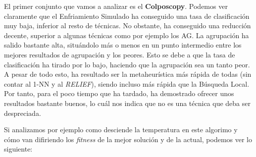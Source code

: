 \documentclass[11pt,a4paper]{article}
\begin{document}
El primer conjunto que vamos a analizar es el \textbf{Colposcopy}. Podemos ver claramente que el Enfriamiento Simulado ha conseguido
una tasa de clasificación muy baja, inferior al resto de técnicas. No obstante, ha conseguido una reducción decente, superior
a algunas técnicas como por ejemplo los AG. La agrupación ha salido bastante alta, situándolo más o menos en un punto intermedio
entre los mejores resultados de agrupación y los peores. Esto se debe a que la tasa de clasificación ha tirado por lo bajo, haciendo
que la agrupación sea un tanto peor. A pesar de todo esto, ha resultado ser la metaheurística más rápida de todas (sin
contar al 1-NN y al \textit{RELIEF}), siendo incluso más rápida que la Búsqueda Local. Por tanto, para el poco tiempo que ha
tardado, ha demostrado ofrecer unos resultados bastante buenos, lo cuál nos indica que no es una técnica que deba ser despreciada.

Si analizamos por ejemplo como desciende la temperatura en este algorimo y cómo van difiriendo los \textit{fitness} de la mejor
solución y de la actual, podemos ver lo siguiente:
\end{document}
